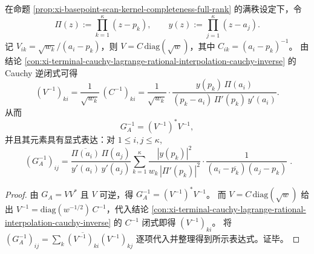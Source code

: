 \begin{proposition}\label{prop:xi-basepoint-scan-gram-inverse-closed-form}
在命题 \ref{prop:xi-basepoint-scan-kernel-completeness-full-rank} 的满秩设定下，令
\[
\Pi(z):=\prod_{k=1}^{\kappa}(z-p_k),\qquad
y(z):=\prod_{j=1}^{\kappa}(z-a_j).
\]
记 \(V_{ik}=\sqrt{w_k}/(a_i-p_k)\)，则 \(V=C\,\mathrm{diag}(\sqrt w)\)，其中 \(C_{ik}=(a_i-p_k)^{-1}\)。
由结论 \ref{con:xi-terminal-cauchy-lagrange-rational-interpolation-cauchy-inverse} 的 Cauchy 逆闭式可得
\[
(V^{-1})_{k i}
=\frac{1}{\sqrt{w_k}}\,(C^{-1})_{k i}
=\frac{1}{\sqrt{w_k}}\cdot
\frac{y(p_k)\,\Pi(a_i)}{(p_k-a_i)\,\Pi'(p_k)\,y'(a_i)}.
\]
从而
\[
G_A^{-1}=(V^{-1})^\ast V^{-1},
\]
并且其元素具有显式表达：对 \(1\le i,j\le \kappa\),
\[
\boxed{\;
(G_A^{-1})_{ij}
=
\frac{\overline{\Pi(a_i)}\,\Pi(a_j)}{y'(a_i)\,y'(a_j)}
\sum_{k=1}^{\kappa}
\frac{|y(p_k)|^2}{w_k\,|\Pi'(p_k)|^2}\cdot
\frac{1}{(a_i-\overline{p_k})(a_j-p_k)}\; }.
\]
\end{proposition}
\begin{proof}
由 \(G_A=VV^\ast\) 且 \(V\) 可逆，得 \(G_A^{-1}=(V^{-1})^\ast V^{-1}\)。
而 \(V=C\,\mathrm{diag}(\sqrt w)\) 给出 \(V^{-1}=\mathrm{diag}(w^{-1/2})\,C^{-1}\)，代入结论 \ref{con:xi-terminal-cauchy-lagrange-rational-interpolation-cauchy-inverse} 的 \(C^{-1}\) 闭式即得 \((V^{-1})_{ki}\)。
将
\(
(G_A^{-1})_{ij}=\sum_{k}\overline{(V^{-1})_{ki}}(V^{-1})_{kj}
\)
逐项代入并整理得到所示表达式。证毕。
\end{proof}



